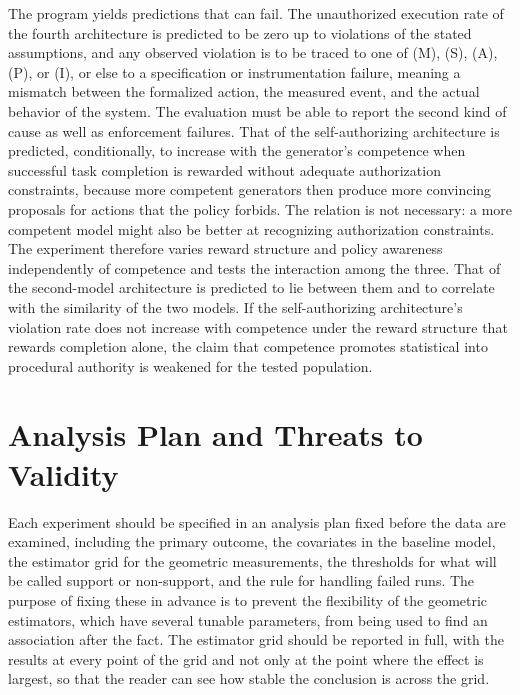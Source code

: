The program yields predictions that can fail. The unauthorized execution rate of the fourth architecture is predicted to be zero up to violations of the stated assumptions, and any observed violation is to be traced to one of (M), (S), (A), (P), or (I), or else to a specification or instrumentation failure, meaning a mismatch between the formalized action, the measured event, and the actual behavior of the system. The evaluation must be able to report the second kind of cause as well as enforcement failures. That of the self-authorizing architecture is predicted, conditionally, to increase with the generator's competence when successful task completion is rewarded without adequate authorization constraints, because more competent generators then produce more convincing proposals for actions that the policy forbids. The relation is not necessary: a more competent model might also be better at recognizing authorization constraints. The experiment therefore varies reward structure and policy awareness independently of competence and tests the interaction among the three. That of the second-model architecture is predicted to lie between them and to correlate with the similarity of the two models. If the self-authorizing architecture's violation rate does not increase with competence under the reward structure that rewards completion alone, the claim that competence promotes statistical into procedural authority is weakened for the tested population.

\section{Analysis Plan and Threats to Validity}

Each experiment should be specified in an analysis plan fixed before the data are examined, including the primary outcome, the covariates in the baseline model, the estimator grid for the geometric measurements, the thresholds for what will be called support or non-support, and the rule for handling failed runs. The purpose of fixing these in advance is to prevent the flexibility of the geometric estimators, which have several tunable parameters, from being used to find an association after the fact. The estimator grid should be reported in full, with the results at every point of the grid and not only at the point where the effect is largest, so that the reader can see how stable the conclusion is across the grid.

